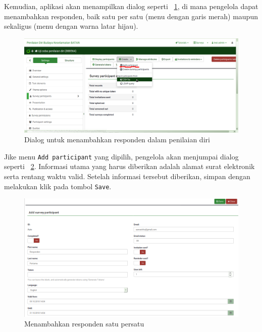 Kemudian, aplikasi akan menampilkan dialog seperti \figurename~\ref{fig:addResponden}, di mana pengelola dapat menambahkan responden, baik satu per satu (menu dengan garis merah) maupun sekaligus (menu dengan warna latar hijau).

\begin{figure}
  \begin{center}
    \includegraphics[scale=.25]{pics/addResponden.png}
    \caption{Dialog untuk menambahkan responden dalam penilaian diri}
    \label{fig:addResponden}
  \end{center}
\end{figure}

Jike menu \texttt{Add participant} yang dipilih, pengelola akan menjumpai dialog seperti \figurename~\ref{fig:addResponden1}. Informasi utama yang harus diberikan adalah alamat surat elektronik serta rentang waktu valid. Setelah informasi tersebut diberikan, simpan dengan melakukan klik pada tombol \texttt{Save}.

\begin{figure}
  \begin{center}
    \includegraphics[scale=.5]{pics/addResponden1.png}
    \caption{Menambahkan responden satu persatu}
    \label{fig:addResponden1}
  \end{center}
\end{figure}

